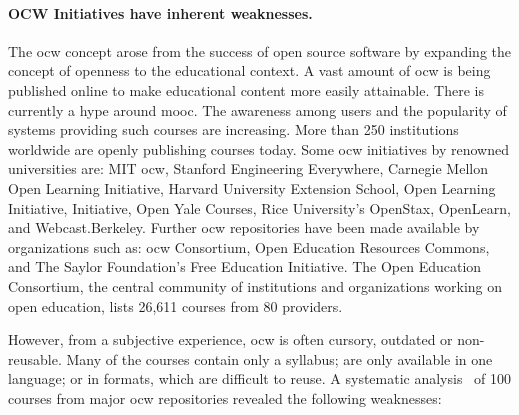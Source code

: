 \documentclass[PhD, Submit, ngerman,UKenglish,table]{scrbook}
\begin{document}
\paragraph{OCW Initiatives have inherent weaknesses.}
The \gls{ocw} concept arose from the success of open source software by expanding the concept of openness to the educational context.
A vast amount of \gls{ocw} is being published online to make educational content more easily attainable.
There is currently a hype around \gls{mooc}.
The awareness among users and the popularity of systems providing such courses are increasing.
More than 250 institutions worldwide are openly publishing courses today.
Some \gls{ocw} initiatives by renowned universities are: MIT \gls{ocw}, Stanford Engineering Everywhere, Carnegie Mellon Open Learning Initiative, Harvard University Extension School, Open Learning Initiative, Initiative, Open Yale Courses, Rice University's OpenStax, OpenLearn, and Webcast.Berkeley. 
Further \gls{ocw} repositories have been made available by organizations such as: \gls{ocw} Consortium, Open Education Resources Commons, and The Saylor Foundation's Free Education Initiative.
The Open Education Consortium, the central community of institutions and organizations working on open education, lists 26,611 courses from 80 providers.

However, from a subjective experience, \gls{ocw} is often cursory, outdated or non-reusable.
Many of the courses contain only a syllabus; are only available in one language; or in formats, which are difficult to reuse.
A systematic analysis~\cite{sahar_vahdati_2015_14756} of 100 courses from major \gls{ocw} repositories revealed the following weaknesses:
\end{document}
